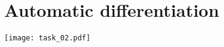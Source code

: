  \section{Automatic differentiation}
 \begin{center}
 \texttt{[image: task\_02.pdf]}    
 

 \end{center}
 